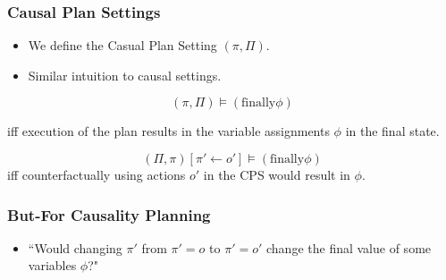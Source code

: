 \documentclass{beamer}
\theoremstyle{plain}
\theoremstyle{definition}
\begin{document}
\begin{frame}
\frametitle{Causal Plan Settings}
\begin{itemize}
\item We define the Casual Plan Setting $(\pi, \Pi)$.
\item Similar intuition to causal settings.
\newline
\end{itemize}


\[
(\pi,\Pi)\models (\textrm{finally} \phi)
\]

iff execution of the plan results in the variable assignments $\phi$ in the final state.

\[
(\Pi, \pi)[\pi'\leftarrow o'] \models (\textrm{finally} \phi)
\]
iff counterfactually using actions $o'$ in the CPS would result in $\phi$.

\end{frame}




\begin{frame}
\frametitle{But-For Causality Planning}
\begin{itemize}
\item ``Would changing $\pi'$ from $\pi'=o$ to $\pi'= o'$ change the final value of some variables $\phi$?"
\end{itemize}

\end{frame}
\end{document}
